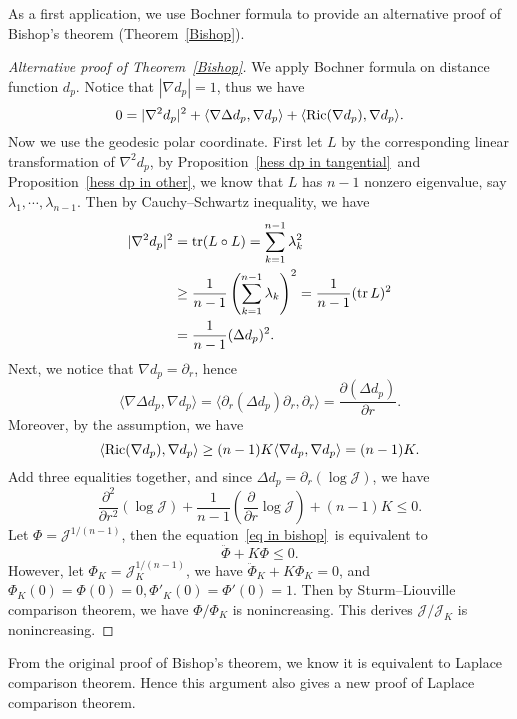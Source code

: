 As a first application, we use Bochner formula to provide an alternative proof of Bishop's theorem (Theorem~\ref{Bishop}).
\begin{proof}[Alternative proof of Theorem~\ref{Bishop}]
    We apply Bochner formula on distance function $d_p$.
    Notice that $|\nabla d_p|=1$, thus we have
    \[0=|\nabla^2d_p|^2+\langle\nabla\Delta d_p,\nabla d_p\rangle+\langle\operatorname{Ric}(\nabla d_p),\nabla d_p\rangle.\]
    Now we use the geodesic polar coordinate.
    First let $L$ by the corresponding linear transformation of $\nabla^2d_p$, by Proposition~\ref{hess dp in tangential}~and Proposition~\ref{hess dp in other}, we know that $L$ has $n-1$ nonzero eigenvalue, say $\lambda_1,\cdots,\lambda_{n-1}$.
    Then by Cauchy--Schwartz inequality, we have
    \begin{align*}
        |\nabla^2d_p|^2&=\operatorname{tr}(L\circ L)=\sum_{k=1}^{n-1}\lambda^2_k\\
        &\geq\frac{1}{n-1}\left(\sum_{k=1}^{n-1}\lambda_k\right)^2=\frac{1}{n-1}(\operatorname{tr} L)^2\\
        &=\frac{1}{n-1}(\Delta d_p)^2.
    \end{align*}
    Next, we notice that $\nabla d_p=\partial_r$, hence
    \[\langle\nabla\Delta d_p,\nabla d_p\rangle=\langle\partial_r(\Delta d_p)\partial_r,\partial_r\rangle=\frac{\partial(\Delta d_p)}{\partial{r}}.\]
    Moreover, by the assumption, we have
    \[\langle\operatorname{Ric}(\nabla d_p),\nabla d_p\rangle\geq(n-1)K\langle\nabla d_p,\nabla d_p\rangle=(n-1)K.\]
    Add three equalities together, and since $\Delta d_p=\partial_r(\log\mathscr{J})$, we have
    \begin{equation}
        \frac{\partial^2{}}{\partial{r^2}}(\log\mathscr{J})+\frac{1}{n-1}\left(\frac{\partial{}}{\partial{r}}\log\mathscr{J}\right)+(n-1)K\leq 0.\label{eq in bishop}
    \end{equation}
    Let $\Phi=\mathscr{J}^{1/(n-1)}$, then the equation~\eqref{eq in bishop}~is equivalent to
    \[\ddot{\Phi}+K\Phi\leq 0.\]
    However, let $\Phi_K=\mathscr{J}_K^{1/(n-1)}$, we have $\ddot{\Phi}_K+K\Phi_K=0$, and $\Phi_K(0)=\Phi(0)=0, \Phi'_K(0)=\Phi'(0)=1$.
    Then by Sturm--Liouville comparison theorem, we have $\Phi/\Phi_K$ is nonincreasing.
    This derives $\mathscr{J}/\mathscr{J}_K$ is nonincreasing.
\end{proof}

\begin{rem}
    From the original proof of Bishop's theorem, we know it is equivalent to Laplace comparison theorem.
    Hence this argument also gives a new proof of Laplace comparison theorem.
\end{rem}

